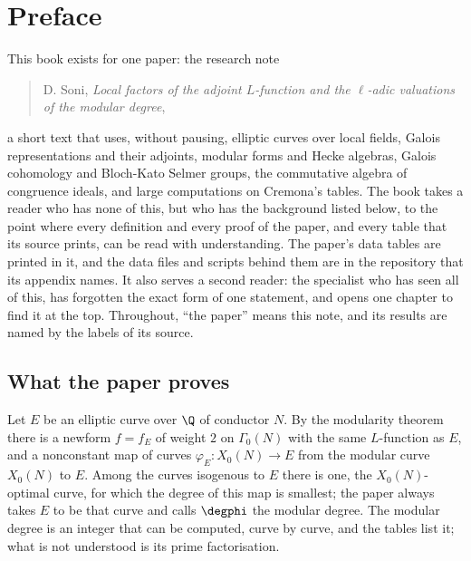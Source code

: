 \chapter*{Preface}

This book exists for one paper: the research note
\begin{quote}
D. Soni, \emph{Local factors of the adjoint $L$-function and the $\ell$-adic valuations of the
modular degree},
\end{quote}
a short text that uses, without pausing, elliptic curves over local fields, Galois representations
and their adjoints, modular forms and Hecke algebras, Galois cohomology and Bloch-Kato Selmer
groups, the commutative algebra of congruence ideals, and large computations on Cremona's tables.
The book takes a reader who has none of this, but who has the background listed below, to the
point where every definition and every proof of the paper, and every table that its source
prints, can be read with understanding. The paper's data tables are printed in it, and the data
files and scripts behind them are in the repository that its appendix names. It also serves a second reader: the specialist who has seen all of this, has
forgotten the exact form of one statement, and opens one chapter to find it at the top.
Throughout, ``the paper'' means this note, and its results are named by the labels of its source.

\section*{What the paper proves}

Let $E$ be an elliptic curve over $\Q$ of conductor $N$. By the modularity theorem there is a
newform $f=f_E$ of weight $2$ on $\Gamma_0(N)$ with the same $L$-function as $E$, and a nonconstant
map of curves $\varphi_E\colon X_0(N)\to E$ from the modular curve $X_0(N)$ to $E$. Among the
curves isogenous to $E$ there is one, the $X_0(N)$-optimal curve, for which the degree of this map
is smallest; the paper always takes $E$ to be that curve and calls $\degphi$ the modular degree.
The modular degree is an integer that can be computed, curve by curve, and the tables list it;
what is not understood is its prime factorisation.

